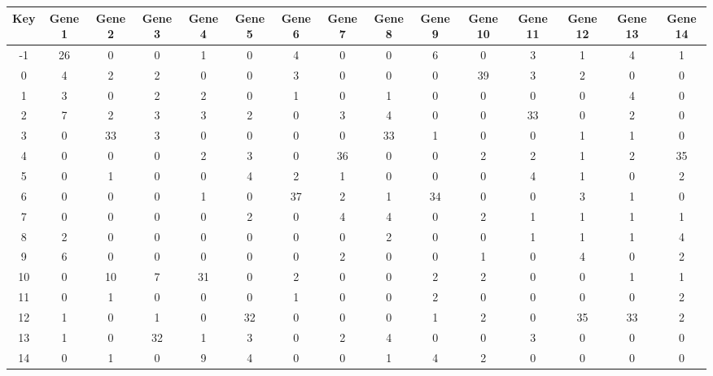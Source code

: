 \begin{tabular}{|c|c|c|c|c|c|c|c|c|c|c|c|c|c|c|}
\hline
Key & Gene 1 & Gene 2 & Gene 3 & Gene 4 & Gene 5 & Gene 6 & Gene 7 & Gene 8 & Gene 9 & Gene 10 & Gene 11 & Gene 12 & Gene 13 & Gene 14 \\
\hline
-1 & 26 & 0 & 0 & 1 & 0 & 4 & 0 & 0 & 6 & 0 & 3 & 1 & 4 & 1 \\
0 & 4 & 2 & 2 & 0 & 0 & 3 & 0 & 0 & 0 & 39 & 3 & 2 & 0 & 0 \\
1 & 3 & 0 & 2 & 2 & 0 & 1 & 0 & 1 & 0 & 0 & 0 & 0 & 4 & 0 \\
2 & 7 & 2 & 3 & 3 & 2 & 0 & 3 & 4 & 0 & 0 & 33 & 0 & 2 & 0 \\
3 & 0 & 33 & 3 & 0 & 0 & 0 & 0 & 33 & 1 & 0 & 0 & 1 & 1 & 0 \\
4 & 0 & 0 & 0 & 2 & 3 & 0 & 36 & 0 & 0 & 2 & 2 & 1 & 2 & 35 \\
5 & 0 & 1 & 0 & 0 & 4 & 2 & 1 & 0 & 0 & 0 & 4 & 1 & 0 & 2 \\
6 & 0 & 0 & 0 & 1 & 0 & 37 & 2 & 1 & 34 & 0 & 0 & 3 & 1 & 0 \\
7 & 0 & 0 & 0 & 0 & 2 & 0 & 4 & 4 & 0 & 2 & 1 & 1 & 1 & 1 \\
8 & 2 & 0 & 0 & 0 & 0 & 0 & 0 & 2 & 0 & 0 & 1 & 1 & 1 & 4 \\
9 & 6 & 0 & 0 & 0 & 0 & 0 & 2 & 0 & 0 & 1 & 0 & 4 & 0 & 2 \\
10 & 0 & 10 & 7 & 31 & 0 & 2 & 0 & 0 & 2 & 2 & 0 & 0 & 1 & 1 \\
11 & 0 & 1 & 0 & 0 & 0 & 1 & 0 & 0 & 2 & 0 & 0 & 0 & 0 & 2 \\
12 & 1 & 0 & 1 & 0 & 32 & 0 & 0 & 0 & 1 & 2 & 0 & 35 & 33 & 2 \\
13 & 1 & 0 & 32 & 1 & 3 & 0 & 2 & 4 & 0 & 0 & 3 & 0 & 0 & 0 \\
14 & 0 & 1 & 0 & 9 & 4 & 0 & 0 & 1 & 4 & 2 & 0 & 0 & 0 & 0 \\
\hline
\end{tabular}